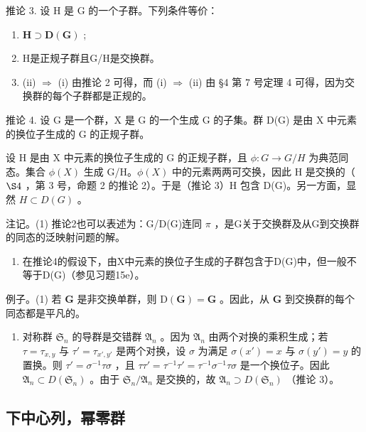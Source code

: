 推论 3. 设 H 是 G 的一个子群。下列条件等价：

\begin{enumerate}
\def\labelenumi{(\roman{enumi})}
\item
  \(\mathbf{H} \supset \mathbf{D}(\mathbf{G})\) ;
\item
  H是正规子群且G/H是交换群。
\item
  (ii) \(\Rightarrow\) (i) 由推论 2 可得，而 (i) \(\Rightarrow\) (ii) 由 §4 第 7 号定理 4 可得，因为交换群的每个子群都是正规的。
\end{enumerate}

推论 4. 设 G 是一个群，X 是 G 的一个生成 G 的子集。群 D(G) 是由 X 中元素的换位子生成的 G 的正规子群。

设 H 是由 X 中元素的换位子生成的 G 的正规子群，且 \(\phi: G \to G/H\) 为典范同态。集合 \(\phi(X)\) 生成 G/H。\(\phi(X)\) 中的元素两两可交换，因此 H 是交换的（ \(\S 4\) ，第 3 号，命题 2 的推论 2）。于是（推论 3）H 包含 D(G)。另一方面，显然 \(H \subset D(G)\) 。

注记。(1) 推论2也可以表述为：G/D(G)连同 \(\pi\) ，是G关于交换群及从G到交换群的同态的泛映射问题的解。

\begin{enumerate}
\def\labelenumi{(\arabic{enumi})}
\setcounter{enumi}{1}
\tightlist
\item
  在推论4的假设下，由X中元素的换位子生成的子群包含于D(G)中，但一般不等于D(G)（参见习题15e）。
\end{enumerate}

例子。(1) 若 \(\mathbf{G}\) 是非交换单群，则 \(\mathrm{D}(\mathbf{G}) = \mathbf{G}\) 。因此，从 \(\mathbf{G}\) 到交换群的每个同态都是平凡的。

\begin{enumerate}
\def\labelenumi{(\arabic{enumi})}
\setcounter{enumi}{1}
\tightlist
\item
  对称群 \(\mathfrak{S}_n\) 的导群是交错群 \(\mathfrak{A}_n\) 。因为 \(\mathfrak{A}_n\) 由两个对换的乘积生成；若 \(\tau = \tau_{x,y}\) 与 \(\tau' = \tau_{x',y'}\) 是两个对换，设 \(\sigma\) 为满足 \(\sigma(x') = x\) 与 \(\sigma(y') = y\) 的置换。则 \(\tau' = \sigma^{-1}\tau\sigma\) ，且 \(\tau\tau' = \tau^{-1}\tau' = \tau^{-1}\sigma^{-1}\tau\sigma\) 是一个换位子。因此 \(\mathfrak{A}_n \subset D(\mathfrak{S}_n)\) 。由于 \(\mathfrak{S}_n / \mathfrak{A}_n\) 是交换的，故 \(\mathfrak{A}_n \supset D(\mathfrak{S}_n)\) （推论 3）。
\end{enumerate}

\subsection{下中心列，幂零群}

